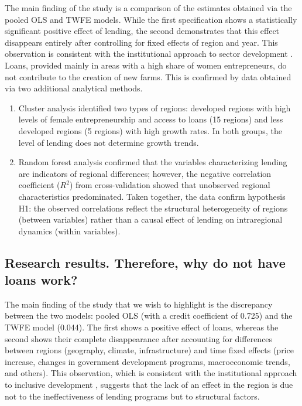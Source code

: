 ﻿\documentclass[pdflatex,sn-mathphys-ay]{sn-jnl}
\begin{document}
The main finding of the study is a comparison of the estimates obtained
via the pooled OLS and TWFE models. While the first specification
shows a statistically significant positive effect of lending, the second
demonstrates that this effect disappears entirely after controlling for
fixed effects of region and year. This observation is consistent with
the institutional approach to sector development \citep{ref78,ref90}. Loans, provided mainly in areas with a
high share of women entrepreneurs, do not contribute to the creation of
new farms. This is confirmed by data obtained via two additional
analytical methods.

\begin{enumerate}
\item Cluster analysis identified two types of regions: developed
regions with high levels of female entrepreneurship and access to loans
(15 regions) and less developed regions (5 regions) with high growth
rates. In both groups, the level of lending does not determine growth
trends.

\item Random forest analysis confirmed that the variables characterizing
lending are indicators of regional differences; however, the negative
correlation coefficient ($R^2$) from cross-validation showed that
unobserved regional characteristics predominated. Taken together, the
data confirm hypothesis H1: the observed correlations reflect the
structural heterogeneity of regions (between variables) rather than a
causal effect of lending on intraregional dynamics (within variables).
\end{enumerate}

\subsection{Research results. Therefore, why do not have loans work?}

The main finding of the study that we wish to highlight is the
discrepancy between the two models: pooled OLS (with a credit
coefficient of 0.725) and the TWFE model (0.044). The first shows a
positive effect of loans, whereas the second shows their complete
disappearance after accounting for differences between regions
(geography, climate, infrastructure) and time fixed effects (price
increase, changes in government development programs, macroeconomic
trends, and others). This observation, which is consistent with the institutional
approach to inclusive development \citep{ref78,ref90}, suggests that the lack of an effect in the
region is due not to the ineffectiveness of lending programs but to
structural factors.
\end{document}
